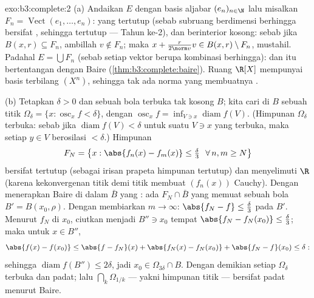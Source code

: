 \begin{solution}{exo:b3:complete:2}
(a) Andaikan $E$  dengan basis aljabar $(e_n)_{n\in\N}$
lalu misalkan $F_n = \operatorname{Vect}(e_1, \dots, e_n)$: yang tertutup
(sebab subruang berdimensi berhingga bersifat , sehingga tertutup ---
Tahun ke-2), dan berinterior kosong: sebab jika $B(x, r) \subseteq F_n$, ambillah
$v \notin F_n$; maka $x + \frac{r}{2\norm v}v \in B(x,r)
\setminus F_n$, mustahil. Padahal $E = \bigcup F_n$ (sebab setiap vektor berupa
kombinasi berhingga): dan itu bertentangan dengan Baire
(\cref{thm:b3:complete:baire}). Ruang $\R[X]$ mempunyai
basis terbilang $(X^n)$, sehingga tak ada norma yang membuatnya .

(b) Tetapkan $\delta > 0$ dan sebuah bola terbuka tak kosong $B$; kita cari di
$B$ sebuah titik $\Omega_\delta = \{x : \operatorname{osc}_xf <
\delta\}$, dengan $\operatorname{osc}_xf = \inf_{V \ni
x}\operatorname{diam} f(V)$. (Himpunan $\Omega_\delta$ terbuka: sebab jika
$\operatorname{diam}f(V) < \delta$ untuk suatu $V \ni x$ yang terbuka, maka setiap
$y \in V$ berosilasi $< \delta$.) Himpunan
\[
F_N = \bigl\{x : \abs{f_n(x) - f_m(x)} \leq \tfrac\delta3\
\ \forall\, n, m \geq N \bigr\}
\]
bersifat tertutup (sebagai irisan prapeta himpunan tertutup) dan
menyelimuti $\R$ (karena kekonvergenan titik demi titik membuat $(f_n(x))$ Cauchy).
Dengan menerapkan Baire di dalam $\bar B$ yang : ada $F_N \cap
\bar B$ yang memuat sebuah bola $B' = B(x_0, \rho)$. Dengan membiarkan $m \to
\infty$: $\abs{f_N - f} \leq \frac\delta3$ pada $B'$. Menurut
 $f_N$ di $x_0$, ciutkan menjadi $B'' \ni x_0$ tempat
$\abs{f_N - f_N(x_0)} \leq \frac\delta3$; maka untuk $x \in B''$,
\[
\abs{f(x) - f(x_0)} \leq \abs{f - f_N}(x) + \abs{f_N(x) -
f_N(x_0)} + \abs{f_N - f}(x_0) \leq \delta:
\]
sehingga $\operatorname{diam} f(B'') \leq 2\delta$, jadi $x_0 \in
\Omega_{3\delta} \cap B$. Dengan demikian setiap $\Omega_\delta$ terbuka dan
padat; lalu $\bigcap_k\Omega_{1/k}$ --- yakni himpunan titik 
--- bersifat padat menurut Baire.
\end{solution}

